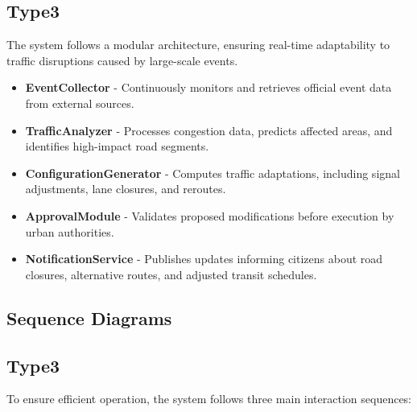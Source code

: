 \documentclass[a4paper,12pt]{article}
\begin{document}
\subsection*{Type3}
The system follows a modular architecture, ensuring real-time adaptability to traffic disruptions caused by large-scale events.
\begin{itemize}
    \item \textbf{EventCollector} - Continuously monitors and retrieves official event data from external sources.
    \item \textbf{TrafficAnalyzer} - Processes congestion data, predicts affected areas, and identifies high-impact road segments.
    \item \textbf{ConfigurationGenerator} - Computes traffic adaptations, including signal adjustments, lane closures, and reroutes.
    \item \textbf{ApprovalModule} - Validates proposed modifications before execution by urban authorities.
    \item \textbf{NotificationService} - Publishes updates informing citizens about road closures, alternative routes, and adjusted transit schedules.
\end{itemize}

\newpage

\subsection{Sequence Diagrams}
\subsection*{Type3}
To ensure efficient operation, the system follows three main interaction sequences:
\end{document}
